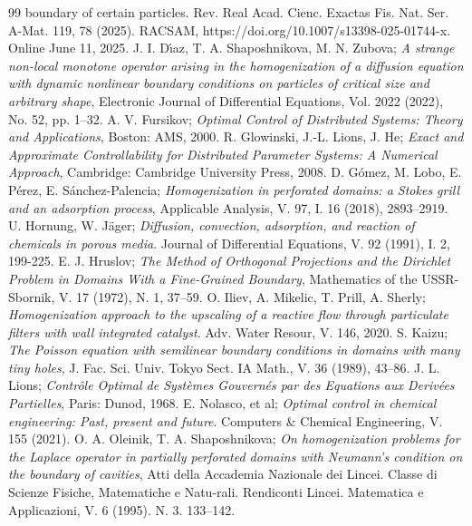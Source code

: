 \documentclass[10pt,a4paper]{amsart}
\numberwithin{equation}{section}
\begin{document}
\begin{thebibliography}{99}
{boundary of certain particles}. Rev. Real Acad. Cienc. Exactas Fis. Nat. Ser.
A-Mat. 119, 78 (2025). RACSAM, https://doi.org/10.1007/s13398-025-01744-x.
Online June 11, 2025.
  J. I. D\'{\i}az, T. A. Shaposhnikova,  M. N. Zubova;
\emph{A strange non-local monotone operator arising in the homogenization
of a diffusion equation with dynamic nonlinear boundary conditions on
particles of critical size and arbitrary shape}, Electronic Journal of
Differential Equations, Vol. 2022 (2022), No. 52, pp. 1--32.
  A. V. Fursikov;
\emph{Optimal Control of Distributed Systems: Theory and Applications}, 
Boston: AMS, 2000.
  R. Glowinski, J.-L. Lions, J. He;
\emph{Exact and Approximate Controllability for Distributed Parameter Systems: 
A Numerical Approach},
Cambridge: Cambridge University Press, 2008.
  D. G\'{o}mez, M. Lobo, E. P\'{e}rez, E. S\'{a}nchez-Palencia;
\emph{Homogenization in perforated domains: a Stokes grill and an
adsorption process}, Applicable Analysis, V. 97, I. 16 (2018), 2893--2919.
  U. Hornung, W. J\"{a}ger;
\emph{Diffusion, convection, adsorption, and reaction of chemicals in porous media}. 
Journal of Differential Equations, V. 92 (1991), I. 2, 199-225.
  E. J. Hruslov;
\emph{The Method of Orthogonal Projections and the
Dirichlet Problem in Domains With a Fine-Grained Boundary},
 Mathematics of the USSR-Sbornik, V. 17 (1972), N. 1, 37--59.
  O. Iliev, A. Mikelic, T. Prill, A. Sherly;
\emph{Homogenization approach to the upscaling of a reactive flow through
particulate filters with wall integrated catalyst}. Adv. Water Resour, V. 146,
2020.
  S. Kaizu;
\emph{The Poisson equation with semilinear boundary
conditions in domains with many tiny holes},
 J. Fac. Sci. Univ. Tokyo Sect. IA Math., V. 36 (1989), 43--86.
  J. L. Lions;
\emph{Contr\^{o}le Optimal de Syst\`{e}mes Gouvern\'{e}s par des Equations 
aux Deriv\'{e}es Partielles}, Paris: Dunod, 1968.
  E. Nolasco, et al;
\emph{Optimal control in chemical engineering: Past, present and future}. 
Computers \& Chemical Engineering, V. 155 (2021).
  O. A. Oleinik, T. A. Shaposhnikova;
\emph{On homogenization problems for the Laplace operator in partially 
perforated domains with Neumann's condition on the boundary of cavities}, 
Atti della Accademia Nazionale dei Lincei. Classe di Scienze Fisiche, 
Matematiche e Natu-rali.
Rendiconti Lincei. Matematica e Applicazioni, V. 6 (1995). N. 3. 133--142.

\end{thebibliography}
\end{document}
